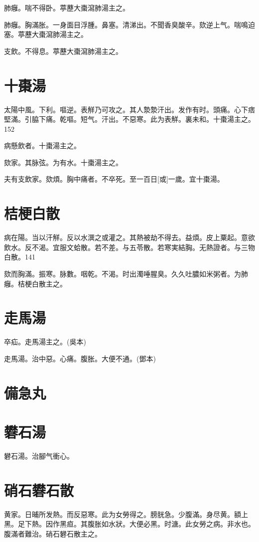 \documentclass[12pt,oneside,UTF8,b5paper]{ctexbook}她她她她她她她
\begin{document}
肺癰。喘不得卧。葶藶大棗瀉肺湯主之。

肺癰。胸滿胀。一身面目浮腫。鼻塞。清涕出。不聞香臭酸辛。欬逆上气。喘鳴迫塞。葶藶大棗瀉肺湯主之。

支飲。不得息。葶藶大棗瀉肺湯主之。

\section{十棗湯}

太陽中風。下利。嘔逆。表觧乃可攻之。其人漐漐汗出。发作有时。頭痛。心下痞堅滿。引脇下痛。乾嘔。短气。汗出。不惡寒。此为表觧。裏未和。十棗湯主之。152

病懸飲者。十棗湯主之。

欬家。其脉弦。为有水。十棗湯主之。

夫有支飲家。欬煩。胸中痛者。不卒死。至一百日[或]一歲。宜十棗湯。

\section{桔梗白散}

病在陽。当以汗觧。反以水潠之或灌之。其熱被劫不得去。益煩。皮上粟起。意欲飲水。反不渴。宜服文蛤散。若不差。与五苓散。若寒実結胸。无熱證者。与三物白散。141

欬而胸滿。振寒。脉數。咽乾。不渴。时出濁唾腥臭。久久吐膿如米粥者。为肺癰。桔梗白散主之。

\section{走馬湯}

卒疝。走馬湯主之。(吳本)

走馬湯。治中惡。心痛。腹胀。大便不通。(鄧本)

\section{備急丸}

\section{礬石湯}

礬石湯。治腳气衝心。

\section{硝石礬石散}

黄家。日晡所发熱。而反惡寒。此为女勞得之。膀胱急。少腹滿。身尽黄。額上黑。足下熱。因作黑疸。其腹胀如水狀。大便必黑。时溏。此女勞之病。非水也。腹滿者難治。硝石礬石散主之。
\end{document}
